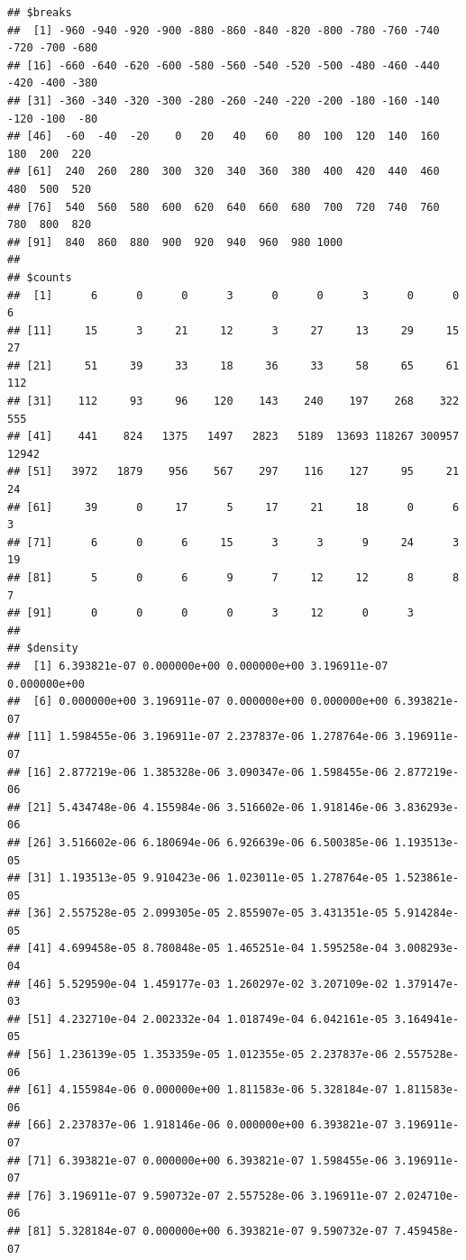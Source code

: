 \documentclass[
]{article}
\begin{document}
\begin{verbatim}
## $breaks
##  [1] -960 -940 -920 -900 -880 -860 -840 -820 -800 -780 -760 -740 -720 -700 -680
## [16] -660 -640 -620 -600 -580 -560 -540 -520 -500 -480 -460 -440 -420 -400 -380
## [31] -360 -340 -320 -300 -280 -260 -240 -220 -200 -180 -160 -140 -120 -100  -80
## [46]  -60  -40  -20    0   20   40   60   80  100  120  140  160  180  200  220
## [61]  240  260  280  300  320  340  360  380  400  420  440  460  480  500  520
## [76]  540  560  580  600  620  640  660  680  700  720  740  760  780  800  820
## [91]  840  860  880  900  920  940  960  980 1000
## 
## $counts
##  [1]      6      0      0      3      0      0      3      0      0      6
## [11]     15      3     21     12      3     27     13     29     15     27
## [21]     51     39     33     18     36     33     58     65     61    112
## [31]    112     93     96    120    143    240    197    268    322    555
## [41]    441    824   1375   1497   2823   5189  13693 118267 300957  12942
## [51]   3972   1879    956    567    297    116    127     95     21     24
## [61]     39      0     17      5     17     21     18      0      6      3
## [71]      6      0      6     15      3      3      9     24      3     19
## [81]      5      0      6      9      7     12     12      8      8      7
## [91]      0      0      0      0      3     12      0      3
## 
## $density
##  [1] 6.393821e-07 0.000000e+00 0.000000e+00 3.196911e-07 0.000000e+00
##  [6] 0.000000e+00 3.196911e-07 0.000000e+00 0.000000e+00 6.393821e-07
## [11] 1.598455e-06 3.196911e-07 2.237837e-06 1.278764e-06 3.196911e-07
## [16] 2.877219e-06 1.385328e-06 3.090347e-06 1.598455e-06 2.877219e-06
## [21] 5.434748e-06 4.155984e-06 3.516602e-06 1.918146e-06 3.836293e-06
## [26] 3.516602e-06 6.180694e-06 6.926639e-06 6.500385e-06 1.193513e-05
## [31] 1.193513e-05 9.910423e-06 1.023011e-05 1.278764e-05 1.523861e-05
## [36] 2.557528e-05 2.099305e-05 2.855907e-05 3.431351e-05 5.914284e-05
## [41] 4.699458e-05 8.780848e-05 1.465251e-04 1.595258e-04 3.008293e-04
## [46] 5.529590e-04 1.459177e-03 1.260297e-02 3.207109e-02 1.379147e-03
## [51] 4.232710e-04 2.002332e-04 1.018749e-04 6.042161e-05 3.164941e-05
## [56] 1.236139e-05 1.353359e-05 1.012355e-05 2.237837e-06 2.557528e-06
## [61] 4.155984e-06 0.000000e+00 1.811583e-06 5.328184e-07 1.811583e-06
## [66] 2.237837e-06 1.918146e-06 0.000000e+00 6.393821e-07 3.196911e-07
## [71] 6.393821e-07 0.000000e+00 6.393821e-07 1.598455e-06 3.196911e-07
## [76] 3.196911e-07 9.590732e-07 2.557528e-06 3.196911e-07 2.024710e-06
## [81] 5.328184e-07 0.000000e+00 6.393821e-07 9.590732e-07 7.459458e-07

\end{verbatim}
\end{document}
